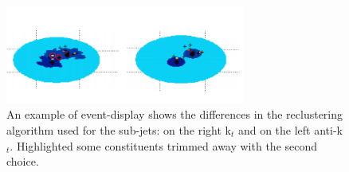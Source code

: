 \begin{figure}[!ht]
  \centering
      \includegraphics[width=0.7\textwidth]{jet_part/mtas/evtdspl.png}
  \caption[Different reclustering in event display]{An example of event-display shows the differences in the reclustering algorithm used for the sub-jets: on the right  k$_t$ and on the left anti-k$_t$. Highlighted some constituents trimmed away with the second choice.}
  \label{fig:evtdspl}
\end{figure}



   

   

   



